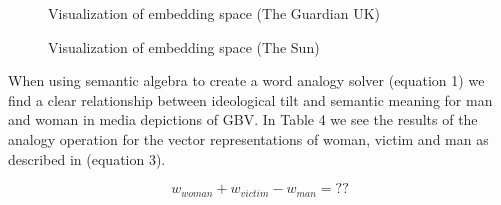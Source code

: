 \documentclass{article}
\begin{document}
{{\begin{figure}[H]
	\caption{\label{fig:my-label1} Visualization of embedding space (The Guardian UK)}
\end{figure}

\begin{figure}[H]
	\caption{\label{fig:my-label1} Visualization of embedding space (The Sun)}
\end{figure}


When using semantic algebra to create a word analogy solver (equation 1) we find a clear relationship between ideological tilt and semantic meaning for man and woman in media depictions of GBV. In Table 4 we see the results of the analogy operation for the vector representations of woman, victim and man as described in (equation 3).

\begin{equation} \label{eu_eqn}
	w_{woman} + w_{victim} - w_{man} = ??
\end{equation}

}}
\end{document}
